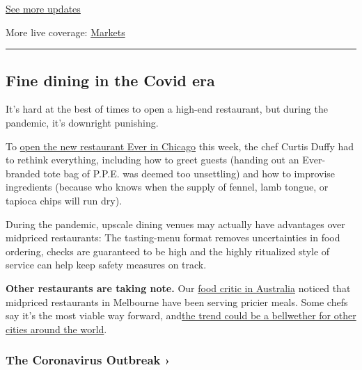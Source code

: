\href{https://www.nytimes.com/2020/08/01/world/coronavirus-covid-19.html?action=click\&pgtype=Article\&state=default\&region=MAIN_CONTENT_1\&context=storylines_live_updates}{See
more updates}

More live coverage:
\href{https://www.nytimes.com/live/2020/07/31/business/stock-market-today-coronavirus?action=click\&pgtype=Article\&state=default\&region=MAIN_CONTENT_1\&context=storylines_live_updates}{Markets}

\begin{center}\rule{0.5\linewidth}{\linethickness}\end{center}

\hypertarget{fine-dining-in-the-covid-era}{%
\subsection{Fine dining in the Covid
era}\label{fine-dining-in-the-covid-era}}

It's hard at the best of times to open a high-end restaurant, but during
the pandemic, it's downright punishing.

To
\href{https://www.nytimes.com/2020/07/28/dining/ever-chicago-restaurant-coronavirus.html}{open
the new restaurant Ever in Chicago} this week, the chef Curtis Duffy had
to rethink everything, including how to greet guests (handing out an
Ever-branded tote bag of P.P.E. was deemed too unsettling) and how to
improvise ingredients (because who knows when the supply of fennel, lamb
tongue, or tapioca chips will run dry).

During the pandemic, upscale dining venues may actually have advantages
over midpriced restaurants: The tasting-menu format removes
uncertainties in food ordering, checks are guaranteed to be high and the
highly ritualized style of service can help keep safety measures on
track.

\textbf{Other restaurants are taking note.} Our
\href{https://www.nytimes.com/column/australia-fare}{food critic in
Australia} noticed that midpriced restaurants in Melbourne have been
serving pricier meals. Some chefs say it's the most viable way forward,
and\href{https://www.nytimes.com/2020/07/28/dining/melbourne-restaurants-coronavirus.html}{the
trend could be a bellwether for other cities around the world}.

\href{https://www.nytimes.com/news-event/coronavirus?action=click\&pgtype=Article\&state=default\&region=MAIN_CONTENT_3\&context=storylines_faq}{}

\hypertarget{the-coronavirus-outbreak-}{%
\subsubsection{The Coronavirus Outbreak
›}\label{the-coronavirus-outbreak-}}

